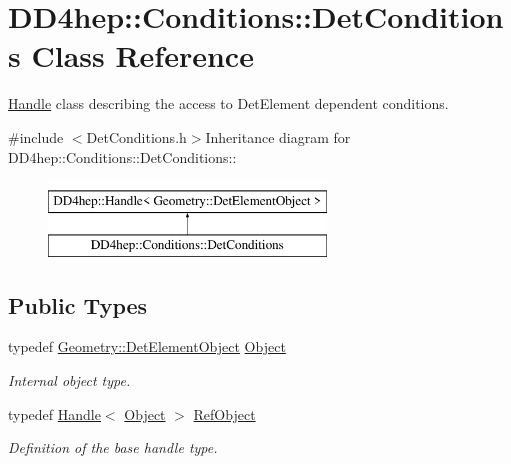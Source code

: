 \hypertarget{class_d_d4hep_1_1_conditions_1_1_det_conditions}{
\section{DD4hep::Conditions::DetConditions Class Reference}
\label{class_d_d4hep_1_1_conditions_1_1_det_conditions}
}


\hyperlink{class_d_d4hep_1_1_handle}{Handle} class describing the access to DetElement dependent conditions.  


{\ttfamily \#include $<$DetConditions.h$>$}Inheritance diagram for DD4hep::Conditions::DetConditions::\begin{figure}[H]
\begin{center}
\leavevmode
\includegraphics[height=2cm]{class_d_d4hep_1_1_conditions_1_1_det_conditions}
\end{center}
\end{figure}
\subsection*{Public Types}
\begin{DoxyCompactItemize}
\item 
typedef \hyperlink{class_d_d4hep_1_1_geometry_1_1_det_element_object}{Geometry::DetElementObject} \hyperlink{class_d_d4hep_1_1_conditions_1_1_det_conditions_a4c0ad456b1967b5b724894f23ef63dec}{Object}
\begin{DoxyCompactList}\small\item\em Internal object type. \item\end{DoxyCompactList}\item 
typedef \hyperlink{class_d_d4hep_1_1_handle}{Handle}$<$ \hyperlink{class_d_d4hep_1_1_geometry_1_1_det_element_object}{Object} $>$ \hyperlink{class_d_d4hep_1_1_conditions_1_1_det_conditions_ab958ffc02b500f3404f001bec0eca780}{RefObject}
\begin{DoxyCompactList}\small\item\em Definition of the base handle type. \item\end{DoxyCompactList}\end{DoxyCompactItemize}
